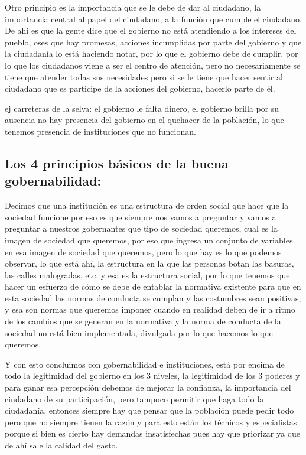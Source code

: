 \documentclass[
  jou,
  floatsintext,
  longtable,
  a4paper,
  nolmodern,
  notxfonts,
  notimes,
  12pt,
  colorlinks=true,linkcolor=blue,citecolor=blue,urlcolor=blue]{apa7}
\begin{document}
Otro principio es la importancia que se le debe de dar al ciudadano, la
importancia central al papel del ciudadano, a la función que cumple el
ciudadano. De ahí es que la gente dice que el gobierno no está
atendiendo a los intereses del pueblo, oses que hay promesas, acciones
incumplidas por parte del gobierno y que la ciudadanía lo está haciendo
notar, por lo que el gobierno debe de cumplir, por lo que los ciudadanos
viene a ser el centro de atención, pero no necesariamente se tiene que
atender todas sus necesidades pero si se le tiene que hacer sentir al
ciudadano que es participe de la acciones del gobierno, hacerlo parte de
él.

ej carreteras de la selva: el gobierno le falta dinero, el gobierno
brilla por su ausencia no hay presencia del gobierno en el quehacer de
la población, lo que tenemos presencia de instituciones que no
funcionan.

\subsection{Los 4 principios básicos de la buena
gobernabilidad:}\label{los-4-principios-buxe1sicos-de-la-buena-gobernabilidad}

Decimos que una institución es una estructura de orden social que hace
que la sociedad funcione por eso es que siempre nos vamos a preguntar y
vamos a preguntar a nuestros gobernantes que tipo de sociedad queremos,
cual es la imagen de sociedad que queremos, por eso que ingresa un
conjunto de variables en esa imagen de sociedad que queremos, pero lo
que hay es lo que podemos observar, lo que está ahí, la estructura en la
que las personas botan las basuras, las calles malogradas, etc. y esa es
la estructura social, por lo que tenemos que hacer un esfuerzo de cómo
se debe de entablar la normativa existente para que en esta sociedad las
normas de conducta se cumplan y las costumbres sean positivas, y esa son
normas que queremos imponer cuando en realidad deben de ir a ritmo de
los cambios que se generan en la normativa y la norma de conducta de la
sociedad no está bien implementada, divulgada por lo que hacemos lo que
queremos.

Y con esto concluimos con gobernabilidad e instituciones, está por
encima de todo la legitimidad del gobierno en los 3 niveles, la
legitimidad de los 3 poderes y para ganar esa percepción debemos de
mejorar la confianza, la importancia del ciudadano de su participación,
pero tampoco permitir que haga todo la ciudadanía, entonces siempre hay
que pensar que la población puede pedir todo pero que no siempre tienen
la razón y para esto están los técnicos y especialistas porque si bien
es cierto hay demandas insatisfechas pues hay que priorizar ya que de
ahí sale la calidad del gasto.
\end{document}

